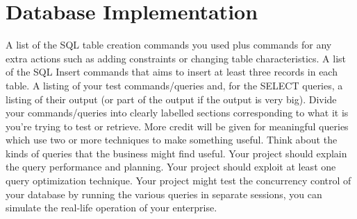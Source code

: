 \section{Database Implementation}\label{Section label}
A list of the SQL table creation commands you used plus commands for
any extra actions such as adding constraints or changing table
characteristics.
A list of the SQL Insert commands that aims to insert at least three
records in each table.
A listing of your test commands/queries and, for the SELECT queries, a
listing of their output (or part of the output if the output is very big). Divide your commands/queries into clearly labelled sections corresponding to what it is you're trying to test or retrieve. More credit will be given for meaningful queries which use two or more techniques to make something useful. Think about the kinds of queries that the business might find useful.
Your project should explain the query performance and planning.
Your project should exploit at least one query optimization technique.
Your project might test the concurrency control of your database by
running the various queries in separate sessions, you can simulate the
real-life operation of your enterprise.
